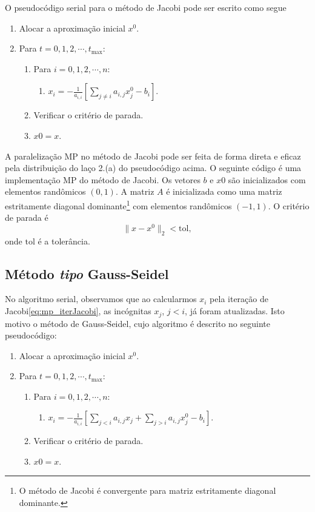 O pseudocódigo serial para o método de Jacobi pode ser escrito como segue
\begin{enumerate}
\item Alocar a aproximação inicial $x^0$.
\item Para $t=0,1,2,\cdots,t_{\text{max}}$:
  \begin{enumerate}
  \item Para $i=0,1,2,\cdots,n$:
    \begin{enumerate}
    \item $\displaystyle x_i = -\frac{1}{a_{i,i}}\left[\sum_{j\neq i}a_{i,j}x^0_j - b_i\right]$.
    \end{enumerate}
  \item Verificar o critério de parada.
  \item $x0 = x$.
  \end{enumerate}
\end{enumerate}

A paralelização MP no método de Jacobi pode ser feita de forma direta e eficaz pela distribuição do laço 2.(a) do pseudocódigo acima. O seguinte código é uma implementação MP do método de Jacobi. Os vetores $b$ e $x0$ são inicializados com elementos randômicos $(0, 1)$. A matriz $A$ é inicializada como uma matriz estritamente diagonal dominante\footnote{O método de Jacobi é convergente para matriz estritamente diagonal dominante.} com elementos randômicos $(-1, 1)$. O critério de parada é
\begin{equation}
  \|x-x^0\|_2 < \text{tol},
\end{equation}
onde $\text{tol}$ é a tolerância.



\subsection{Método {\it tipo} Gauss-Seidel}\label{subsec:mp_mitsislin_GS}

No algoritmo serial, observamos que ao calcularmos $x_i$ pela iteração de Jacobi\eqref{eq:mp_iterJacobi}, as incógnitas $x_j$, $j<i$, já foram atualizadas. Isto motivo o método de Gauss-Seidel, cujo algoritmo é descrito no seguinte pseudocódigo:
\begin{enumerate}
\item Alocar a aproximação inicial $x^0$.
\item Para $t=0,1,2,\cdots,t_{\text{max}}$:
  \begin{enumerate}
  \item Para $i=0,1,2,\cdots,n$:
    \begin{enumerate}
    \item $\displaystyle x_i = -\frac{1}{a_{i,i}}\left[\sum_{j<i}a_{i,j}x_j + \sum_{j>i}a_{i,j}x^0_j - b_i\right]$.
    \end{enumerate}
  \item Verificar o critério de parada.
  \item $x0 = x$.
  \end{enumerate}
\end{enumerate}

